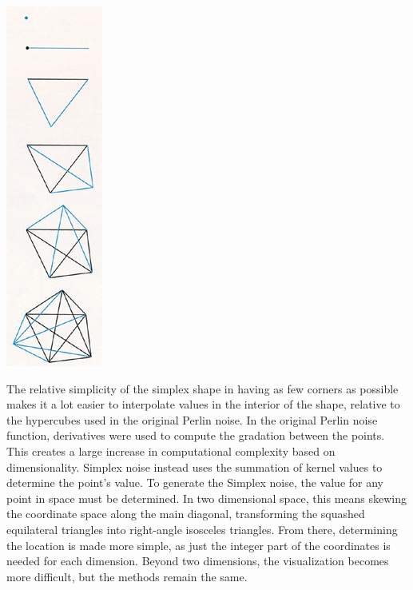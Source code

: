 \documentclass[10pt]{report}
\begin{document}
		\begin{minipage}{\textwidth}
			\centering
			\includegraphics[scale=.75]{six simplexes}
			\label{fig:fig2}
		\end{minipage}
	
		The relative simplicity of the simplex shape in having as few corners as possible makes it a lot easier to interpolate values in the interior of the shape, relative to the hypercubes used in the original Perlin noise.
		In the original Perlin noise function, derivatives were used to compute the gradation between the points. This creates a large increase in computational complexity based on dimensionality. Simplex noise instead uses the summation of kernel values to determine the point's value. To generate the Simplex noise, the value for any point in space must be determined. In two dimensional space, this means skewing the coordinate space along the main diagonal, transforming the squashed equilateral triangles into right-angle isosceles triangles. From there, determining the location is made more simple, as just the integer part of the coordinates is needed for each dimension. Beyond two dimensions, the visualization becomes more difficult, but the methods remain the same.  
		
\end{document}
